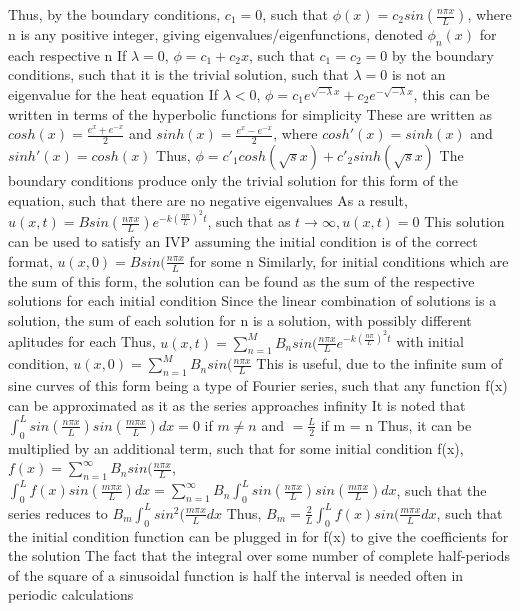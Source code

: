 \documentclass[11 pt, twoside]{article}
\newenvironment{outline*}
{
	\begin{outline}[enumerate]
	}
	{\end{outline}
}
\begin{document}
\begin{outline*}
			\4 Thus, by the boundary conditions, $c_1 = 0$, such that $\phi(x) = c_2 sin(\frac{n\pi x}{L})$, where n is any positive integer, giving eigenvalues/eigenfunctions, denoted $\phi_n(x)$ for each respective n
		\3 If $\lambda = 0$, $\phi = c_1 + c_2x$, such that $c_1 = c_2 = 0$ by the boundary conditions, such that it is the trivial solution, such that $\lambda = 0$ is not an eigenvalue for the heat equation
		\3 If $\lambda < 0$, $\phi = c_1 e^{\sqrt{-\lambda}x} + c_2 e^{-\sqrt{-\lambda}x}$, this can be written in terms of the hyperbolic functions for simplicity
			\4 These are written as $cosh(x) = \frac{e^x + e^{-x}}{2}$ and $sinh(x) = \frac{e^x - e^{-x}}{2}$, where $cosh'(x) = sinh(x)$ and $sinh'(x) = cosh(x)$
			\4 Thus, $\phi = c'_1 cosh(\sqrt{s}x) + c'_2 sinh(\sqrt{s}x)$
			\4 The boundary conditions produce only the trivial solution for this form of the equation, such that there are no negative eigenvalues
	\2 As a result, $u(x, t) = Bsin(\frac{n\pi x}{L})e^{-k(\frac{n\pi}{L})^2t}$, such that as $t \to \infty, u(x, t) = 0$
		\3 This solution can be used to satisfy an IVP assuming the initial condition is of the correct format, $u(x, 0) = Bsin(\frac{n\pi x}{L}$ for some n
		\3 Similarly, for initial conditions which are the sum of this form, the solution can be found as the sum of the respective solutions for each initial condition
\1 Since the linear combination of solutions is a solution, the sum of each solution for n is a solution, with possibly different aplitudes for each
	\2 Thus, $u(x, t) = \sum_{n = 1}^M B_n sin(\frac{n \pi x}{L}e^{-k(\frac{n\pi}{L})^2t}$ with initial condition, $u(x, 0) = \sum_{n = 1}^M B_n sin(\frac{n \pi x}{L}$
	\2 This is useful, due to the infinite sum of sine curves of this form being a type of Fourier series, such that any function f(x) can be approximated as it as the series approaches infinity
		\3 It is noted that $\int^L_0 sin(\frac{n\pi x}{L})sin(\frac{m\pi x}{L})dx = 0$ if $m \neq n$ and $= \frac{L}{2}$ if m = n
		\3 Thus, it can be multiplied by an additional term, such that for some initial condition f(x), $f(x) = \sum^{\infty}_{n = 1} B_n sin(\frac{n\pi x}{L}$, $\int^L_0 f(x) sin(\frac{m\pi x}{L})dx = \sum_{n = 1}^{\infty} B_n \int^L_0 sin(\frac{n\pi x}{L}) sin(\frac{m\pi x}{L}) dx$, such that the series reduces to $B_m \int^L_0 sin^2(\frac{m\pi x}{L}dx$
		\3 Thus, $B_m = \frac{2}{L} \int^L_0 f(x) sin(\frac{m\pi x}{L}dx$, such that the initial condition function can be plugged in for f(x) to give the coefficients for the solution
	\2 The fact that the integral over some number of complete half-periods of the square of a sinusoidal function is half the interval is needed often in periodic calculations

\end{outline*}
\end{document}
